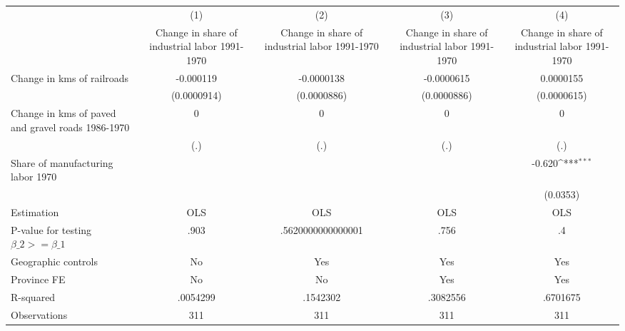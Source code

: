 {
\def\sym#1{\ifmmode^{#1}\else\(^{#1}\)\fi}
\begin{tabular}{l*{4}{c}}
\hline\hline
                &\multicolumn{1}{c}{(1)}&\multicolumn{1}{c}{(2)}&\multicolumn{1}{c}{(3)}&\multicolumn{1}{c}{(4)}\\
                &\multicolumn{1}{c}{Change in share of industrial labor 1991-1970}&\multicolumn{1}{c}{Change in share of industrial labor 1991-1970}&\multicolumn{1}{c}{Change in share of industrial labor 1991-1970}&\multicolumn{1}{c}{Change in share of industrial labor 1991-1970}\\
\hline
Change in kms of railroads&-0.000119         &-0.0000138         &-0.0000615         &0.0000155         \\
                &(0.0000914)         &(0.0000886)         &(0.0000886)         &(0.0000615)         \\
[1em]
Change in kms of paved and gravel roads 1986-1970&        0         &        0         &        0         &        0         \\
                &      (.)         &      (.)         &      (.)         &      (.)         \\
[1em]
Share of manufacturing labor 1970&                  &                  &                  &   -0.620\sym{***}\\
                &                  &                  &                  & (0.0353)         \\
\hline
Estimation      &      OLS         &      OLS         &      OLS         &      OLS         \\
P-value for testing $\beta\_2 >= \beta\_1$&     .903         &.5620000000000001         &     .756         &       .4         \\
Geographic controls&       No         &      Yes         &      Yes         &      Yes         \\
Province FE     &       No         &       No         &      Yes         &      Yes         \\
R-squared       & .0054299         & .1542302         & .3082556         & .6701675         \\
Observations    &      311         &      311         &      311         &      311         \\
\hline\hline
\end{tabular}
}
